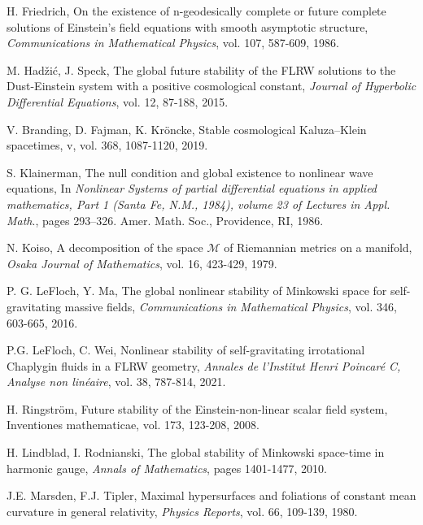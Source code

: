 \documentclass{amsart}
\begin{document}
\begin{thebibliography}{}
 H. Friedrich, On the existence of n-geodesically complete or future complete solutions of Einstein's field equations with smooth asymptotic structure, \textit{Communications in Mathematical Physics}, vol. 107, 587-609, 1986.  






 M. Had{\v{z}}i{\'c}, J. Speck, The global future stability of the FLRW solutions to the Dust-Einstein system with a positive cosmological constant, \textit{Journal of Hyperbolic Differential Equations}, vol. 12, 87-188, 2015.

 V. Branding, D. Fajman, K. Kr{\"o}ncke, Stable cosmological Kaluza--Klein spacetimes, v, vol. 368, 1087-1120, 2019.    


 S. Klainerman, The null condition and global existence to nonlinear wave equations, In \textit{Nonlinear Systems of partial differential equations in applied mathematics, Part 1 (Santa Fe, N.M., 1984), volume 23
of Lectures in Appl. Math}., pages 293–326. Amer. Math. Soc., Providence, RI, 1986.

 N. Koiso, A decomposition of the space $\mathcal{M}$ of Riemannian metrics on a manifold, \textit{Osaka Journal of Mathematics}, vol. 16, 423-429, 1979. 

 P. G. LeFloch, Y. Ma, The global nonlinear stability of Minkowski space for self-gravitating massive fields, \textit{Communications in Mathematical Physics}, vol. 346, 603-665, 2016.  

 P.G. LeFloch, C. Wei, Nonlinear stability of self-gravitating irrotational Chaplygin fluids in a FLRW geometry, \textit{Annales de l'Institut Henri Poincar\'e C, Analyse non lin\'eaire}, vol. 38, 787-814, 2021.  



 H. Ringstr{\"o}m, Future stability of the Einstein-non-linear scalar field system, Inventiones mathematicae, vol. 173, 123-208, 2008.   

 H. Lindblad, I. Rodnianski, The global stability of Minkowski space-time in harmonic gauge, \textit{Annals of Mathematics}, pages 1401-1477, 2010.    

 J.E. Marsden, F.J. Tipler, Maximal hypersurfaces and foliations of constant mean curvature in general relativity, \textit{Physics Reports}, vol. 66, 109-139, 1980.  


\end{thebibliography}
\end{document}
